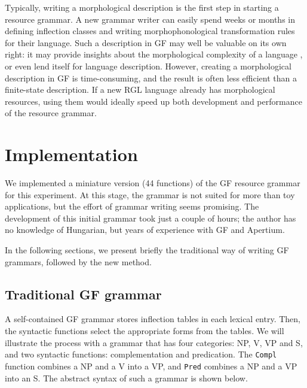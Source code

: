 \documentclass[10pt,a4paper]{article}
\begin{document}
Typically, writing a morphological description is the first step in starting a resource grammar.
A new grammar writer can easily spend weeks or months in defining inflection classes 
and writing morphophonological transformation rules for their language. 
Such a description in GF may well be valuable on its own right: it may provide 
insights about the morphological complexity of a language
\cite{detrez_ranta2012eacl}, or even lend itself for language description.
However, creating a morphological description in GF is time-consuming, and the result 
is often less efficient than a finite-state description.
If a new RGL language already has morphological resources, using them would ideally
speed up both development and performance of the resource grammar.


\section{Implementation}

We implemented a miniature version (44 functions) of the GF resource
grammar \cite{ranta2009lilt} for this experiment. 
At this stage, the grammar is not suited for more than toy
applications, but the effort of grammar writing seems promising.
The development of this initial grammar took just a
couple of hours; the author has no knowledge of Hungarian, but years
of experience with GF and Apertium.

In the following sections, we present briefly the traditional way of writing GF
grammars, followed by the new method.

\subsection{Traditional GF grammar}

A self-contained GF grammar stores inflection tables in each lexical
entry. Then, the syntactic functions select the appropriate forms from
the tables. We will illustrate the process with a grammar that has
four categories: NP, V, VP and S, and two syntactic functions: complementation
and predication. The \texttt{Compl} function combines a NP and a V
into a VP, and \texttt{Pred} combines a NP and a VP into an S.
The abstract syntax of such a grammar is shown below.
 
\end{document}
